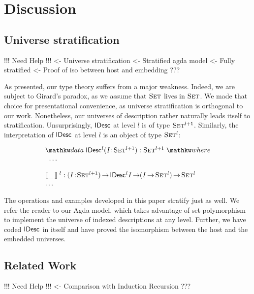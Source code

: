 \section{Discussion}
\label{sec:discussion}

\subsection{Universe stratification}

\begin{wstructure}
!!! Need Help !!!
<- Universe stratification
    <- Stratified agda model
        <- Fully stratified
        <- Proof of iso between host and embedding
    ???
\end{wstructure}

As presented, our type theory suffers from a major weakness. Indeed,
we are subject to Girard's paradox, as we assume that $\Set$ lives in
$\Set$. We made that choice for presentational convenience, as
universe stratification is orthogonal to our work. Nonetheless, our
universes of description rather naturally leads itself to
stratification. Unsurprisingly, $\IDesc{\!}$ at level $l$ is of type
$\Set^{\blue{l+1}}$. Similarly, the interpretation of $\IDesc{\!}$ at
level $l$ is an object of type $\Set^{\blue{l}}$:

\[\stk{
\data \IDesc{\!}^{\blue{l}} (\Bhab{\V{I}}{\Set^{\blue{l+1}}}) : \Set^{\blue{l+1}} \where \\
\;\;\ldots \\
\\
\idescop{\_\:}{}{}^{\blue{l}} : \PI{\V{I}}{\Set^{\blue{l+1}}} \IDesc{{\!}^{\blue{l}}\V{I}} \To (\V{I} \To \Set^{\blue{l}}) \To \Set^{\blue{l}}    \\
\ldots
}\]

The operations and examples developed in this paper stratify just as
well. We refer the reader to our Agda model, which takes advantage of
set polymorphism to implement the universe of indexed descriptions at
any level. Further, we have coded $\IDesc{\!}$ in itself and have
proved the isomorphism between the host and the embedded universes.

\subsection{Related Work}

\begin{structure}
!!! Need Help !!!
<- Comparison with Induction Recursion
    ???
\end{structure}


